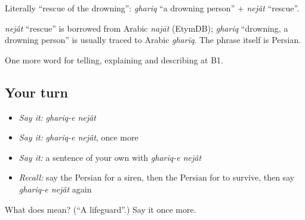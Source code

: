Literally \textquotedblleft{}rescue of the drowning\textquotedblright{}: \emph{ghariq} \textquotedblleft{}a drowning person\textquotedblright{} + \emph{nejât} \textquotedblleft{}rescue\textquotedblright{}.

\begin{cousinweb}
\emph{nejât} \textquotedblleft{}rescue\textquotedblright{} is borrowed from Arabic \emph{najāt} (EtymDB); \emph{ghariq} \textquotedblleft{}drowning, a drowning person\textquotedblright{} is usually traced to Arabic \emph{gharīq}. The phrase itself is Persian.
\end{cousinweb}

\begin{grammarlens}[title={What you've built}]
One more word for telling, explaining and describing at B1.
\end{grammarlens}

\subsection*{Your turn}
\begin{itemize}
\raggedright
  \item \emph{Say it:} \emph{ghariq-e nejât}
  \item \emph{Say it:} \emph{ghariq-e nejât}, once more
  \item \emph{Say it:} a sentence of your own with \emph{ghariq-e nejât}
  \item \emph{Recall:} say the Persian for a siren, then the Persian for to survive, then say \emph{ghariq-e nejât} again
\end{itemize}

\begin{tcolorbox}[breakable,colback=teal!4,colframe=teal!35!black,title={Before you move on}]
What does   mean? (\textquotedblleft{}A lifeguard\textquotedblright{}.) Say it once more.
\end{tcolorbox}

